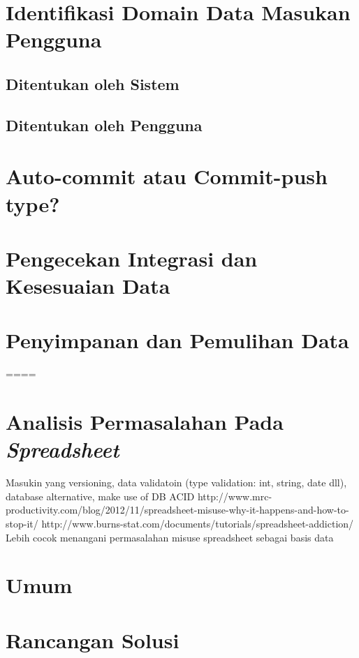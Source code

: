 \section{Identifikasi Domain Data Masukan Pengguna}
\subsection{Ditentukan oleh Sistem}

\subsection{Ditentukan oleh Pengguna}


\section{Auto-commit atau Commit-push type?}

\section{Pengecekan Integrasi dan Kesesuaian Data}



\section{Penyimpanan dan Pemulihan Data}



====




\section{Analisis Permasalahan Pada \textit{Spreadsheet}}
\blindtext
Masukin yang versioning, data validatoin (type validation: int, string, date dll), database alternative, make use of DB ACID
http://www.mrc-productivity.com/blog/2012/11/spreadsheet-misuse-why-it-happens-and-how-to-stop-it/
http://www.burns-stat.com/documents/tutorials/spreadsheet-addiction/
Lebih cocok menangani permasalahan misuse spreadsheet sebagai basis data


\section{ Umum}
\blindtext

\section{Rancangan Solusi}
\blindtext